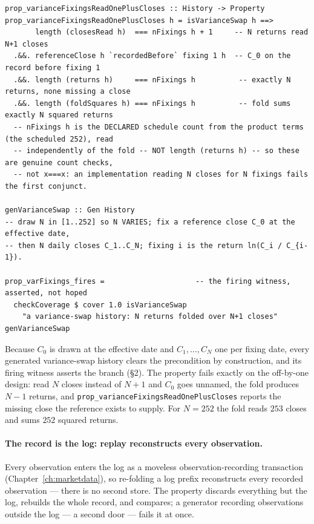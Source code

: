 \begin{lstlisting}
prop_varianceFixingsReadOnePlusCloses :: History -> Property
prop_varianceFixingsReadOnePlusCloses h = isVarianceSwap h ==>
       length (closesRead h)  === nFixings h + 1     -- N returns read N+1 closes
  .&&. referenceClose h `recordedBefore` fixing 1 h  -- C_0 on the record before fixing 1
  .&&. length (returns h)     === nFixings h          -- exactly N returns, none missing a close
  .&&. length (foldSquares h) === nFixings h          -- fold sums exactly N squared returns
  -- nFixings h is the DECLARED schedule count from the product terms (the scheduled 252), read
  -- independently of the fold -- NOT length (returns h) -- so these are genuine count checks,
  -- not x===x: an implementation reading N closes for N fixings fails the first conjunct.

genVarianceSwap :: Gen History
-- draw N in [1..252] so N VARIES; fix a reference close C_0 at the effective date,
-- then N daily closes C_1..C_N; fixing i is the return ln(C_i / C_{i-1}).

prop_varFixings_fires =                     -- the firing witness, asserted, not hoped
  checkCoverage $ cover 1.0 isVarianceSwap
    "a variance-swap history: N returns folded over N+1 closes" genVarianceSwap
\end{lstlisting}

Because $C_0$ is drawn at the effective date and $C_1,\dots,C_N$ one per fixing
date, every generated variance-swap history clears the precondition by construction,
and its firing witness asserts the branch (\S 2). The property fails exactly on the off-by-one
design: read $N$ closes
instead of $N+1$ and $C_0$ goes unnamed, the fold produces $N-1$ returns, and
\texttt{prop\_varianceFixingsReadOnePlusCloses} reports the missing close the
reference exists to supply. For $N = 252$ the fold reads $253$ closes and sums $252$
squared returns.

\paragraph{The record is the log: replay reconstructs every observation.}
Every observation enters the log as a moveless observation-recording transaction
(Chapter~\ref{ch:marketdata}), so re-folding a log prefix reconstructs every recorded
observation --- there is no second store. The property discards everything but the log,
rebuilds the whole record, and compares; a generator recording observations outside the log
--- a second door --- fails it at once.

